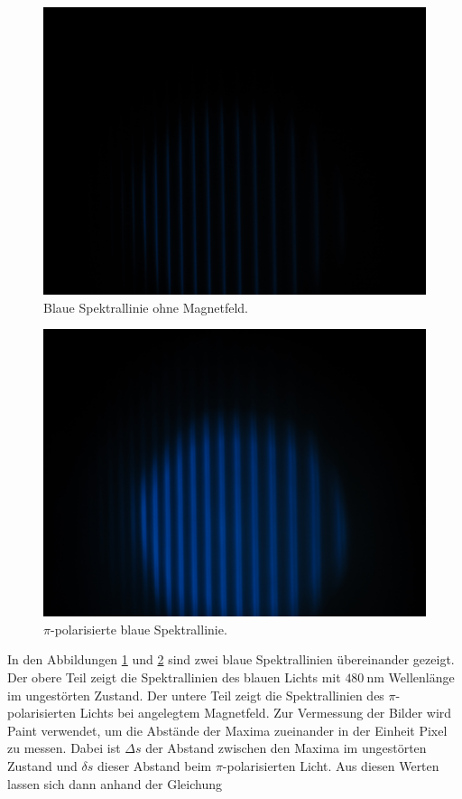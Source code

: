 \begin{figure}
    \centering
    \includegraphics[width=\textwidth]{fotos/blau_0.JPG}
    \caption{Blaue Spektrallinie ohne Magnetfeld.}
    \label{fig:blau_0}
\end{figure}
\hfill
\begin{figure}
    \centering
    \includegraphics[width=\textwidth]{fotos/blau_pi.JPG}
    \caption{$\pi$-polarisierte blaue Spektrallinie.}
    \label{fig:blau_pi}
\end{figure}
\FloatBarrier

In den Abbildungen \ref{fig:blau_0} und \ref{fig:blau_pi} sind zwei blaue Spektrallinien übereinander gezeigt. Der obere Teil zeigt die Spektrallinien des blauen Lichts mit 
$\SI{480}{\nano\metre}$ Wellenlänge im ungestörten Zustand. Der untere Teil zeigt die Spektrallinien des $\pi$-polarisierten Lichts bei 
angelegtem Magnetfeld. Zur Vermessung der Bilder wird Paint verwendet, um die Abstände der Maxima zueinander in der Einheit Pixel zu messen. 
Dabei ist $\Delta s$ der Abstand zwischen den Maxima im ungestörten Zustand und $\delta s$ dieser Abstand beim $\pi$-polarisierten Licht. 
Aus diesen Werten lassen sich dann anhand der Gleichung 


